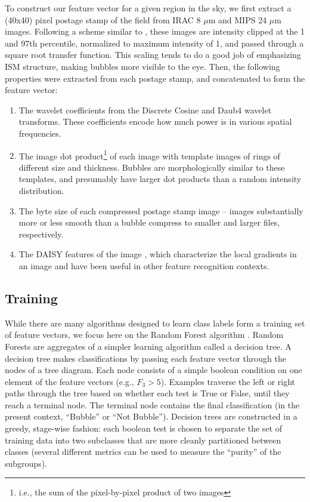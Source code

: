 \documentclass[preprint]{aastex}
\begin{document}
To construct our feature vector for a given region in the sky, we first extract a (40x40) pixel postage stamp of the field from IRAC 8 $\mu$m and MIPS 24 $\mu$m images. Following a scheme similar to \cite{mwp1}, these images are intensity clipped at the 1 and 97th percentile, normalized to maximum intensity of 1, and passed through a square root transfer function. This scaling tends to do a good job of emphasizing ISM structure, making bubbles more visible to the eye. Then, the following properties were extracted from each postage stamp, and concatenated to form the feature vector:

\begin{enumerate}
\item The wavelet coefficients from the Discrete Cosine and Daub4 wavelet transforms. These coefficients encode how much power is in various spatial frequencies.
\item The image dot product\footnote{i.e., the sum of the pixel-by-pixel product of two images} of each image with template images of rings of different size and thickness. Bubbles are morphologically similar to these templates, and presumably have larger dot products than a random intensity distribution.
\item The byte size of each compressed postage stamp image -- images substantially more or less smooth than a bubble compress to smaller and larger files, respectively.
\item The DAISY features of the image \citep{DAISY}, which characterize the local gradients in an image and have been useful in other feature recognition contexts.
\end{enumerate}

\subsection{Training}
While there are many algorithms designed to learn class labels form a training set of feature vectors, we focus here on the Random Forest algorithm \citep{random forest}. Random Forests are aggregates of a simpler learning algorithm called a decision tree. A decision tree makes classifications by passing each feature vector through the nodes of a tree diagram. Each node consists of a simple boolean condition on one element of the feature vectors (e.g., $F_3 > 5$). Examples traverse the left or right paths through the tree based on whether each test is True or False, until they reach a terminal node. The terminal node contains the final classification (in the present context, ``Bubble'' or ``Not Bubble''). Decision trees are constructed in a greedy, stage-wise fashion: each boolean test is chosen to separate the set of training data into two subclasses that are more cleanly partitioned between classes (several different metrics can be used to measure the ``purity'' of the subgroups).
\end{document}
